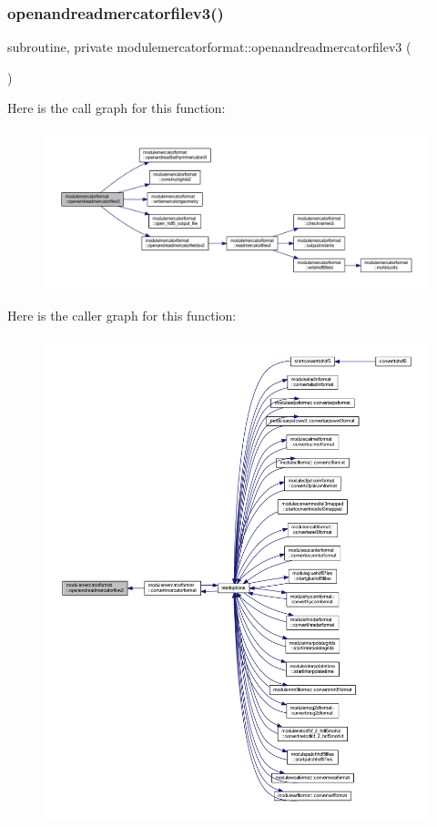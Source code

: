 \subsubsection{\texorpdfstring{openandreadmercatorfilev3()}{openandreadmercatorfilev3()}}
{\footnotesize\ttfamily subroutine, private modulemercatorformat\+::openandreadmercatorfilev3 (\begin{DoxyParamCaption}{ }\end{DoxyParamCaption})\hspace{0.3cm}{\ttfamily [private]}}

Here is the call graph for this function\+:\nopagebreak
\begin{figure}[H]
\begin{center}
\leavevmode
\includegraphics[width=350pt]{namespacemodulemercatorformat_ad3d103ba2c19d6a10af53c4f7caf2a16_cgraph}
\end{center}
\end{figure}
Here is the caller graph for this function\+:\nopagebreak
\begin{figure}[H]
\begin{center}
\leavevmode
\includegraphics[width=350pt]{namespacemodulemercatorformat_ad3d103ba2c19d6a10af53c4f7caf2a16_icgraph}
\end{center}
\end{figure}
